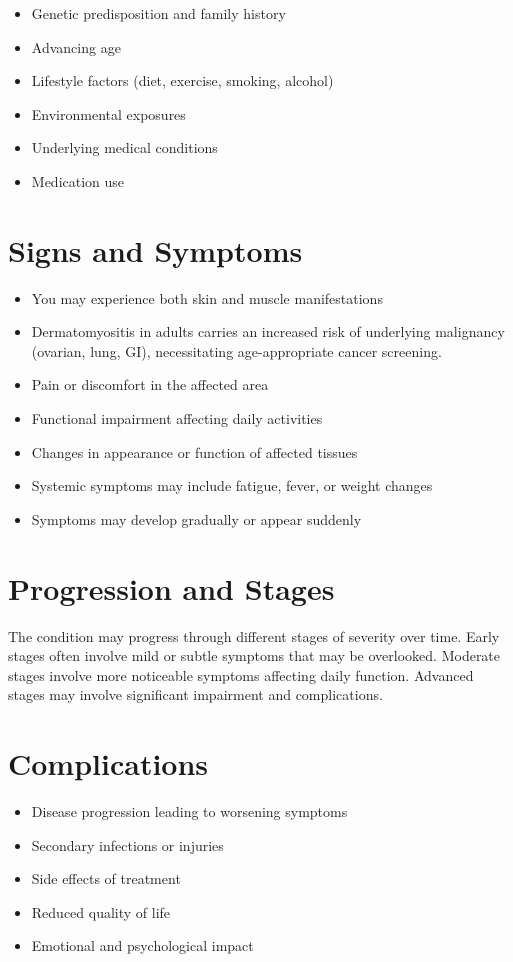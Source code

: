 \begin{itemize}[noitemsep]
  \item Genetic predisposition and family history
  \item Advancing age
  \item Lifestyle factors (diet, exercise, smoking, alcohol)
  \item Environmental exposures
  \item Underlying medical conditions
  \item Medication use
\end{itemize}
\section{Signs and Symptoms}
\begin{itemize}[noitemsep]
  \item You may experience both skin and muscle manifestations
  \item Dermatomyositis in adults carries an increased risk of underlying malignancy (ovarian, lung, GI), necessitating age-appropriate cancer screening.
  \item Pain or discomfort in the affected area
  \item Functional impairment affecting daily activities
  \item Changes in appearance or function of affected tissues
  \item Systemic symptoms may include fatigue, fever, or weight changes
  \item Symptoms may develop gradually or appear suddenly
\end{itemize}
\section{Progression and Stages}
The condition may progress through different stages of severity over time. Early stages often involve mild or subtle symptoms that may be overlooked. Moderate stages involve more noticeable symptoms affecting daily function. Advanced stages may involve significant impairment and complications.
\section{Complications}
\begin{itemize}[noitemsep]
  \item Disease progression leading to worsening symptoms
  \item Secondary infections or injuries
  \item Side effects of treatment
  \item Reduced quality of life
  \item Emotional and psychological impact
\end{itemize}
